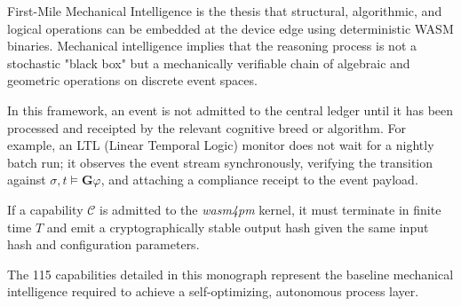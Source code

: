 First-Mile Mechanical Intelligence is the thesis that structural, algorithmic, and logical operations can be embedded at the device edge using deterministic WASM binaries. Mechanical intelligence implies that the reasoning process is not a stochastic "black box" but a mechanically verifiable chain of algebraic and geometric operations on discrete event spaces.

In this framework, an event is not admitted to the central ledger until it has been processed and receipted by the relevant cognitive breed or algorithm. For example, an LTL (Linear Temporal Logic) monitor does not wait for a nightly batch run; it observes the event stream synchronously, verifying the transition against $\sigma, t \models \mathbf{G}\varphi$, and attaching a compliance receipt to the event payload.

\begin{proposition}
If a capability $\mathcal{C}$ is admitted to the \textit{wasm4pm} kernel, it must terminate in finite time $T$ and emit a cryptographically stable output hash given the same input hash and configuration parameters.
\end{proposition}

The 115 capabilities detailed in this monograph represent the baseline mechanical intelligence required to achieve a self-optimizing, autonomous process layer.
